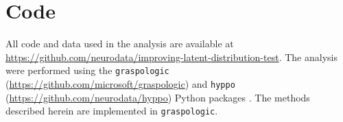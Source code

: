 \section{Code}
All code and data used in the analysis are available at \url{https://github.com/neurodata/improving-latent-distribution-test}. 
The analysis were performed using the \texttt{graspologic} (\url{https://github.com/microsoft/graspologic}) and \texttt{hyppo} (\url{https://github.com/neurodata/hyppo})  Python packages  \cite{chung2019graspy, panda2021hyppo}. 
The methods described herein are implemented in \texttt{graspologic}.
